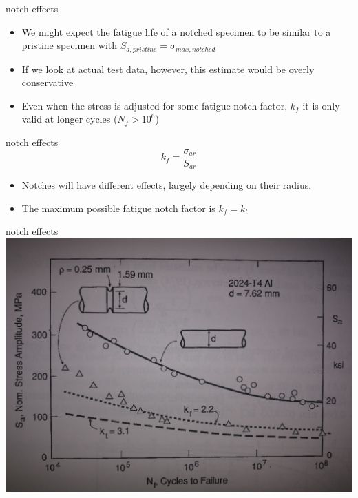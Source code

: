 \documentclass[
  letterpaper,
  ignorenonframetext,
  aspectratio=43,
  handout,
  12pt]{beamer}
\providecommand{\tightlist}{%
  \setlength{\itemsep}{0pt}\setlength{\parskip}{0pt}}
\providecommand{\tightlist}{%
\setlength{\itemsep}{0pt}\setlength{\parskip}{0pt}}
\let\Oldincludegraphics\includegraphics
\renewcommand{\includegraphics}[2][]{\Oldincludegraphics[width=\textwidth,height=0.7\textheight,keepaspectratio]{#2}}
\begin{document}
\begin{frame}{notch effects}
\protect\hypertarget{notch-effects-1}{}
\begin{itemize}
\tightlist
\item
  We might expect the fatigue life of a notched specimen to be similar
  to a pristine specimen with
  \(S_{a, pristine} = \sigma_{max, notched}\)
\item
  If we look at actual test data, however, this estimate would be overly
  conservative
\item
  Even when the stress is adjusted for some fatigue notch factor,
  \(k_f\) it is only valid at longer cycles (\(N_f > 10^6\))
\end{itemize}
\end{frame}

\begin{frame}{notch effects}
\protect\hypertarget{notch-effects-2}{}
\[k_f = \frac{\sigma_{ar}}{S_{ar}}\]

\begin{itemize}
\tightlist
\item
  Notches will have different effects, largely depending on their
  radius.
\item
  The maximum possible fatigue notch factor is \(k_f = k_t\)
\end{itemize}
\end{frame}

\begin{frame}{notch effects}
\protect\hypertarget{notch-effects-3}{}
\includegraphics{../images/notch_effect.jpg}
\end{frame}
\end{document}
